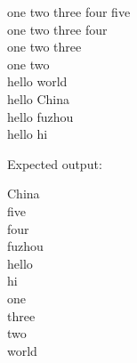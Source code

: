 \documentclass{article}
\begin{document}
    \noindent one two three four five \\
    one two three four \\
    one two three \\
    one two \\
    hello world \\
    hello China \\
    hello fuzhou \\
    hello hi

    \noindent Expected output:

    \noindent China \\
    five \\
    four \\
    fuzhou \\
    hello \\
    hi \\
    one \\
    three \\
    two \\
    world
\end{document}
